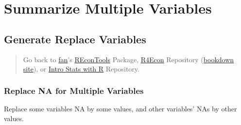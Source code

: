 \documentclass[
]{book}
\newenvironment{Shaded}{\begin{snugshade}}{\end{snugshade}}
\newcommand{\CommentTok}[1]{\textcolor[rgb]{0.56,0.35,0.01}{\textit{#1}}}
\newcommand{\DataTypeTok}[1]{\textcolor[rgb]{0.13,0.29,0.53}{#1}}
\newcommand{\DecValTok}[1]{\textcolor[rgb]{0.00,0.00,0.81}{#1}}
\newcommand{\KeywordTok}[1]{\textcolor[rgb]{0.13,0.29,0.53}{\textbf{#1}}}
\newcommand{\NormalTok}[1]{#1}
\newcommand{\OperatorTok}[1]{\textcolor[rgb]{0.81,0.36,0.00}{\textbf{#1}}}
\newcommand{\OtherTok}[1]{\textcolor[rgb]{0.56,0.35,0.01}{#1}}
\newcommand{\StringTok}[1]{\textcolor[rgb]{0.31,0.60,0.02}{#1}}
\begin{document}
\hypertarget{summarize-multiple-variables}{%
\section{Summarize Multiple Variables}\label{summarize-multiple-variables}}

\hypertarget{generate-replace-variables}{%
\subsection{Generate Replace Variables}\label{generate-replace-variables}}

\begin{quote}
Go back to \href{http://fanwangecon.github.io/}{fan}'s \href{https://fanwangecon.github.io/REconTools/}{REconTools} Package, \href{https://fanwangecon.github.io/R4Econ/}{R4Econ} Repository (\href{https://fanwangecon.github.io/R4Econ/bookdown}{bookdown site}), or \href{https://fanwangecon.github.io/Stat4Econ/}{Intro Stats with R} Repository.
\end{quote}

\hypertarget{replace-na-for-multiple-variables}{%
\subsubsection{Replace NA for Multiple Variables}\label{replace-na-for-multiple-variables}}

Replace some variables NA by some values, and other variables' NAs by other values.

\begin{Shaded}
\end{Shaded}
\end{document}
